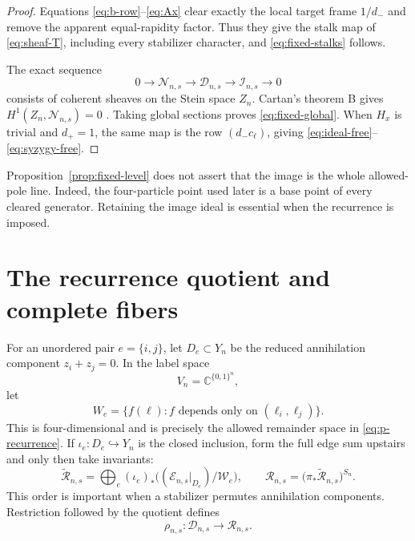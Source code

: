 \documentclass[11pt,reqno]{amsart}
\theoremstyle{definition}
\theoremstyle{remark}
\newcommand{\C}{\mathbb C}
\begin{document}
\begin{proof}
Equations \eqref{eq:b-row}--\eqref{eq:Ax} clear exactly the local target
frame $1/d_-$ and remove the apparent equal-rapidity factor.  Thus they give
the stalk map of \eqref{eq:sheaf-T}, including every stabilizer character,
and \eqref{eq:fixed-stalks} follows.

The exact sequence
\begin{equation}
 0\longrightarrow\mathscr N_{n,s}
 \longrightarrow\mathscr D_{n,s}
 \longrightarrow\mathscr I_{n,s}\longrightarrow0
 \label{eq:fixed-exact}
\end{equation}
consists of coherent sheaves on the Stein space $Z_n$.  Cartan's theorem B
gives $H^1(Z_n,\mathscr N_{n,s})=0$
\cite{SHC_1951-1952__4__A19_0}.  Taking global sections proves
\eqref{eq:fixed-global}.  When $H_x$ is trivial and $d_+=1$, the same map is
the row $(d_-c_{\boldsymbol\ell})$, giving
\eqref{eq:ideal-free}--\eqref{eq:syzygy-free}.
\end{proof}

Proposition~\ref{prop:fixed-level} does not assert that the image is the whole
allowed-pole line.  Indeed, the four-particle point used later is a base point
of every cleared generator.  Retaining the image ideal is essential when the
recurrence is imposed.

\section{The recurrence quotient and complete fibers}
\label{sec:fibers}

For an unordered pair $e=\{i,j\}$, let $D_e\subset Y_n$ be the reduced
annihilation component $z_i+z_j=0$.  In the label space
\begin{equation}
 V_n=\C^{\{0,1\}^n},
\end{equation}
let
\begin{equation}
 W_e=\{f(\boldsymbol\ell):f\text{ depends only on }
 (\ell_i,\ell_j)\}.
 \label{eq:We}
\end{equation}
This is four-dimensional and is precisely the allowed remainder space in
\eqref{eq:p-recurrence}.  If $\iota_e:D_e\hookrightarrow Y_n$ is the closed
inclusion, form the full edge sum upstairs and only then take invariants:
\begin{equation}
 \widetilde{\mathscr R}_{n,s}
 =\bigoplus_e(\iota_e)_*
 \bigl((\mathscr E_{n,s}|_{D_e})/\mathscr W_e\bigr),
 \qquad
 \mathscr R_{n,s}
 =\bigl(\pi_*\widetilde{\mathscr R}_{n,s}\bigr)^{S_n}.
 \label{eq:Rsheaf}
\end{equation}
This order is important when a stabilizer permutes annihilation components.
Restriction followed by the quotient defines
\begin{equation}
 \rho_{n,s}:\mathscr D_{n,s}\longrightarrow\mathscr R_{n,s}.
 \label{eq:rho}
\end{equation}
\end{document}
